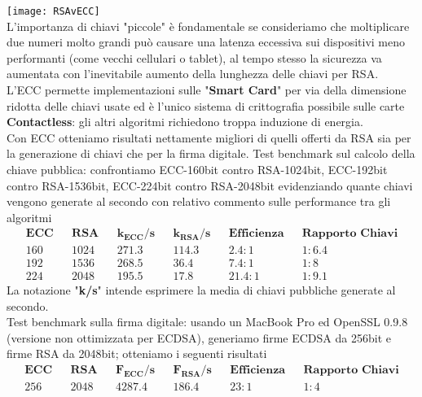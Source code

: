 \documentclass[a4paper,12pt]{tesiinfo}
\begin{document}
\texttt{[image: RSAvECC]}
\\
L'importanza di chiavi "piccole" \`e fondamentale se consideriamo che moltiplicare due numeri molto grandi pu\`o causare una latenza eccessiva sui dispositivi meno performanti (come vecchi cellulari o tablet), al tempo stesso la sicurezza va aumentata con l'inevitabile aumento della lunghezza delle chiavi per RSA.
\\
L'ECC permette implementazioni sulle "\textbf{Smart Card}" per via della dimensione ridotta delle chiavi usate ed \`e l'unico sistema di crittografia possibile sulle carte \textbf{Contactless}: gli altri algoritmi richiedono troppa induzione di energia.
\\
Con ECC otteniamo risultati nettamente migliori di quelli offerti da RSA sia per la generazione di chiavi che per la firma digitale. 
Test benchmark sul calcolo della chiave pubblica: confrontiamo ECC-160bit contro RSA-1024bit, ECC-192bit contro RSA-1536bit, ECC-224bit contro RSA-2048bit evidenziando quante chiavi vengono generate al secondo con relativo commento sulle performance tra gli algoritmi 
\begin{align*}
    &\textbf{ECC}& &\textbf{RSA}& &\textbf{$\mathbold{k_{ECC}}$/s}& &\textbf{$\mathbold{k_{RSA}}$/s}& &\textbf{Efficienza}& &\textbf{Rapporto Chiavi}&\\
    &160& &1024& &271.3& &114.3& &2.4:1& &1:6.4&\\
    &192& &1536& &268.5& &36.4& &7.4:1& &1:8&\\
    &224& &2048& &195.5& &17.8& &21.4:1& &1:9.1&
\end{align*}
La notazione "\textbf{k/s}" intende esprimere la media di chiavi pubbliche generate al secondo.
\\
Test benchmark sulla firma digitale: usando un MacBook Pro ed OpenSSL 0.9.8 (versione non ottimizzata per ECDSA), generiamo firme ECDSA da 256bit e firme RSA da 2048bit; otteniamo i seguenti risultati
\begin{align*}
    &\textbf{ECC}& &\textbf{RSA}& &\textbf{$\mathbold{F_{ECC}}$/s}& &\textbf{$\mathbold{F_{RSA}}$/s}& &\textbf{Efficienza}& &\textbf{Rapporto Chiavi}&\\
    &256& &2048& &4287.4& &186.4& &23:1& &1:4&
\end{align*}
\end{document}
